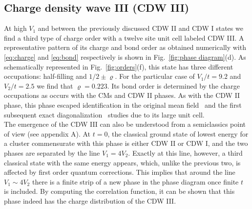 \documentclass[aps,prx,10pt,twocolumn,floatfix,superscriptaddress,showpacs,numerical,footinbib]{revtex4-1}
\begin{document}
\subsection{Charge density wave III (CDW III)}
%
At high $V_{1}$ and between the previously discussed CDW II and CDW I states
we find a third type of charge order with a twelve site unit cell labeled CDW III.
%
A representative pattern of its charge and bond order as obtained numerically 
with \eqref{eq:charge} and \eqref{eq:bond} respectively
is shown in Fig.~\ref{fig:phase diagram}(d).
%
As schematically represented in Fig.~\ref{fig:orders}(f), this state has three 
different occupations: half-filling and $1/2\pm\varrho$.
%
For the particular case of $V_{1}/t=9.2$ and $V_{2}/t=2.5$ we find that $\varrho=0.223$.
%
Its bond order is determined by the charge occupations 
as occurs with the CMs and CDW II phases.
%
As with the CDW II phase, this phase escaped
identification in the original mean field~\cite{RQHZ08,WF10,GCC13} 
and the first subsequent exact diagonalization~\cite{GGNVC13,DH14,DCH14} studies 
due to its large unit cell.\\
%
 The emergence of the CDW III can also be understood from a semiclassics point of view (see appendix A).
At $t=0$, the classical ground state of lowest energy for a cluster commensurate with this phase is either CDW II or CDW I, and the two phases are separated by the line $V_{1}=4V_{2}$. 
%
Exactly at this line, however, a third classical state with the same energy appears, which, unlike the previous two, is affected by first order quantum corrections. 
%
This implies that around the line $V_{1}\sim4V_{2}$ there is a finite strip of a new phase in the phase diagram once finite $t$ is included. 
%
By computing the correlation function, it can be shown that this phase indeed has the charge distribution of the CDW III. 
\end{document}
